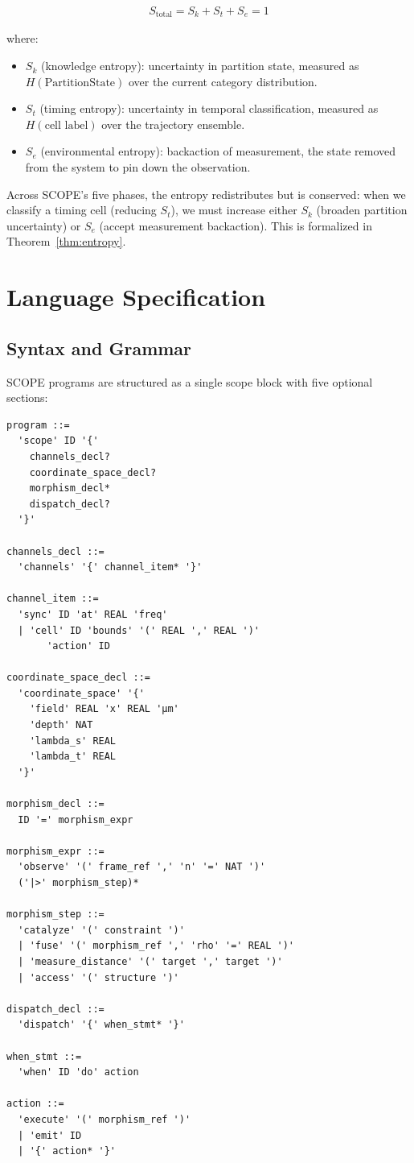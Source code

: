 \documentclass[11pt,twocolumn]{article}
\begin{document}
\begin{definition}
\begin{align}
S_{\text{total}} = S_k + S_t + S_e = 1
\end{align}

\noindent where:
\begin{itemize}
\item $S_k$ (knowledge entropy): uncertainty in partition state, measured as $H(\text{PartitionState})$ over the current category distribution.
\item $S_t$ (timing entropy): uncertainty in temporal classification, measured as $H(\text{cell label})$ over the trajectory ensemble.
\item $S_e$ (environmental entropy): backaction of measurement, the state removed from the system to pin down the observation.
\end{itemize}
\end{definition}

Across SCOPE's five phases, the entropy redistributes but is conserved: when we classify a timing cell (reducing $S_t$), we must increase either $S_k$ (broaden partition uncertainty) or $S_e$ (accept measurement backaction). This is formalized in Theorem~\ref{thm:entropy}.

\section{Language Specification}
\label{sec:language}

\subsection{Syntax and Grammar}

SCOPE programs are structured as a single scope block with five optional sections:

\begin{lstlisting}
program ::=
  'scope' ID '{'
    channels_decl?
    coordinate_space_decl?
    morphism_decl*
    dispatch_decl?
  '}'

channels_decl ::=
  'channels' '{' channel_item* '}'

channel_item ::=
  'sync' ID 'at' REAL 'freq'
  | 'cell' ID 'bounds' '(' REAL ',' REAL ')'
       'action' ID

coordinate_space_decl ::=
  'coordinate_space' '{'
    'field' REAL 'x' REAL 'µm'
    'depth' NAT
    'lambda_s' REAL
    'lambda_t' REAL
  '}'

morphism_decl ::=
  ID '=' morphism_expr

morphism_expr ::=
  'observe' '(' frame_ref ',' 'n' '=' NAT ')'
  ('|>' morphism_step)*

morphism_step ::=
  'catalyze' '(' constraint ')'
  | 'fuse' '(' morphism_ref ',' 'rho' '=' REAL ')'
  | 'measure_distance' '(' target ',' target ')'
  | 'access' '(' structure ')'

dispatch_decl ::=
  'dispatch' '{' when_stmt* '}'

when_stmt ::=
  'when' ID 'do' action

action ::=
  'execute' '(' morphism_ref ')'
  | 'emit' ID
  | '{' action* '}'
\end{lstlisting}
\end{document}
